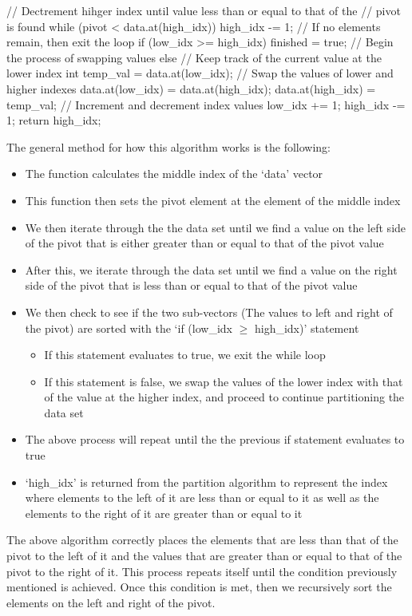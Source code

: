 \begin{highlight}
\begin{code}
{{    // Dectrement hihger index until value less than or equal to that of the 
    // pivot is found
    while (pivot < data.at(high_idx)) {
        high_idx -= 1;
    }
    // If no elements remain, then exit the loop
    if (low_idx >= high_idx) {
        finished = true;
    }
    // Begin the process of swapping values
    else {
        // Keep track of the current value at the lower index
        int temp_val = data.at(low_idx);
        // Swap the values of lower and higher indexes
        data.at(low_idx) = data.at(high_idx);
        data.at(high_idx) = temp_val;
        // Increment and decrement index values
        low_idx += 1;
        high_idx -= 1;
        }
    }
    return high_idx;
}
\end{code}

The general method for how this algorithm works is the following:

\begin{itemize}
    \item The function calculates the middle index of the `data' vector
    \item This function then sets the pivot element at the element of the middle index
    \item We then iterate through the the data set until we find a value on the left side of the pivot that is either greater than or equal to that of the pivot value
    \item After this, we iterate through the data set until we find a value on the right side of the pivot that is less than or equal to that of the pivot value
    \item We then check to see if the two sub-vectors (The values to left and right of the pivot) are sorted with the `if (low\_idx $\geq$ high\_idx)' statement
    \begin{itemize}
        \item If this statement evaluates to true, we exit the while loop
        \item If this statement is false, we swap the values of the lower index with that of the value at the higher index, and proceed to continue partitioning the data set
    \end{itemize}
    \item The above process will repeat until the the previous if statement evaluates to true
    \item `high\_idx' is returned from the partition algorithm to represent the index where elements to the left of it are less than or equal to it as well as the elements to the right of it are greater than or equal to it
\end{itemize}

\noindent The above algorithm correctly places the elements that are less than that of the pivot to the left of it and the values that are greater than or equal to that of the pivot
to the right of it. This process repeats itself until the condition previously mentioned is achieved. Once this condition is met, then we recursively sort the elements on the left and right of the pivot.

\end{highlight}

